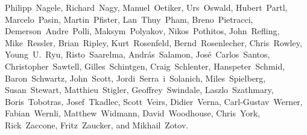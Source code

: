 \begin{flushleft}
  Philipp~Nagele,         %
  Richard~Nagy,           %
  Manuel~Oetiker,         %
  Urs~Oswald,             %
  Hubert~Partl,           %
  Marcelo~Pasin,          %
  Martin~Pfister,		%
  Lan~Thuy~Pham,          %
  Breno~Pietracci,        %
  Demerson~Andre~Polli,   %
  Maksym~Polyakov,        %
  Nikos~Pothitos,		%
  John~Refling,           %
  Mike~Ressler,           %
  Brian~Ripley,           %
  Kurt~Rosenfeld,		%
  Bernd~Rosenlecher,      %
  Chris~Rowley,           %
  Young~U.~Ryu,           %
  Risto~Saarelma,         %
  Andr{\'a}s~Salamon,     %
  Jos\'e~Carlos~Santos,   %
  Christopher~Sawtell,    %
  Gilles~Schintgen,       %
  Craig~Schlenter,        %
  Hanspeter~Schmid,       %
  Baron~Schwartz,         %
  John~Scott,             %
  Jordi~Serra~i~Solanich, %
  Miles~Spielberg,        %
  Susan~Stewart,
  Matthieu~Stigler,
  Geoffrey~Swindale,      %
  Laszlo~Szathmary,       %
  Boris~Tobotras,         %
  Josef~Tkadlec,          %
  Scott~Veirs,            %
  Didier~Verna,           %
  Carl-Gustav~Werner,     %
  Fabian~Wernli,          %
  Matthew~Widmann,        %
  David~Woodhouse,        %
  Chris~York,             %
  Rick~Zaccone,           %
  Fritz~Zaucker,          %
  and Mikhail~Zotov.      %
\end{flushleft}


\pagebreak
\endinput
%

